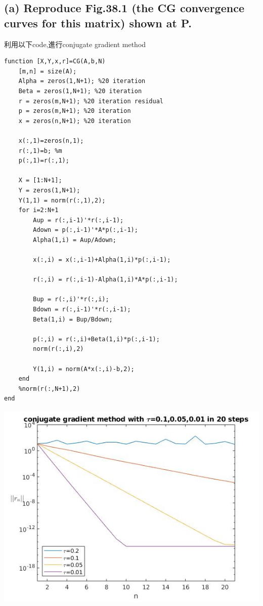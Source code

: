 \documentclass[12pt]{article}
\begin{document}
\subsection{(a) Reproduce Fig.38.1 (the CG convergence curves for this matrix) shown at P.}
利用以下code,進行conjugate gradient method
\begin{lstlisting}
function [X,Y,x,r]=CG(A,b,N)
    [m,n] = size(A);
    Alpha = zeros(1,N+1); %20 iteration
    Beta = zeros(1,N+1); %20 iteration
    r = zeros(m,N+1); %20 iteration residual
    p = zeros(m,N+1); %20 iteration
    x = zeros(n,N+1); %20 iteration

    x(:,1)=zeros(n,1);
    r(:,1)=b; %m
    p(:,1)=r(:,1);

    X = [1:N+1];
    Y = zeros(1,N+1);
    Y(1,1) = norm(r(:,1),2);
    for i=2:N+1
        Aup = r(:,i-1)'*r(:,i-1);
        Adown = p(:,i-1)'*A*p(:,i-1);
        Alpha(1,i) = Aup/Adown;
        
        x(:,i) = x(:,i-1)+Alpha(1,i)*p(:,i-1);

        r(:,i) = r(:,i-1)-Alpha(1,i)*A*p(:,i-1);

        Bup = r(:,i)'*r(:,i);
        Bdown = r(:,i-1)'*r(:,i-1);
        Beta(1,i) = Bup/Bdown;

        p(:,i) = r(:,i)+Beta(1,i)*p(:,i-1);
        norm(r(:,i),2)
        
        Y(1,i) = norm(A*x(:,i)-b,2);
    end
    %norm(r(:,N+1),2)
end
\end{lstlisting}
\includegraphics[scale=1]{1.jpg}
\end{document}
